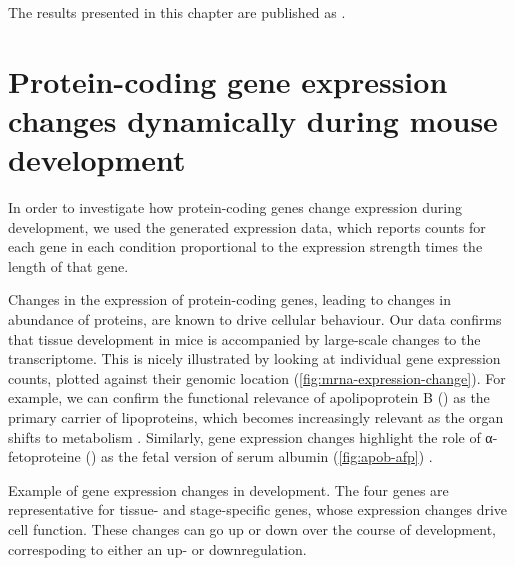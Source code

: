 The results presented in this chapter are published as \citet{Schmitt:2014}.


\section{Protein-coding gene expression changes dynamically during mouse
development}

In order to investigate how protein-coding genes change expression during
development, we used the generated \rnaseq expression data, which reports counts
for each gene in each condition proportional to the expression strength times
the length of that gene.

Changes in the expression of protein-coding genes, leading to changes in
abundance of proteins, are known to drive cellular behaviour\todo[ref]{}. Our
data confirms that tissue development in mice is accompanied by large-scale
changes to the \mrna transcriptome. This is nicely illustrated by looking at
individual gene expression counts, plotted against their genomic location
(\cref{fig:mrna-expression-change}). For example, we can confirm the functional
relevance of apolipoprotein B () as the primary carrier of
lipoproteins, which becomes increasingly relevant as the organ shifts to
metabolism \citep{Knott:1986}. Similarly, \mrna gene expression changes
highlight the role of α-fetoproteine () as the fetal version of
serum albumin (\cref{fig:apob-afp}) \citep{Chen:1997}.

    {Example of gene expression changes in development.}
    {The four genes are representative for tissue- and stage-specific genes,
    whose expression changes drive cell function. These changes can go up or
    down over the course of development, correspoding to either an up- or
    downregulation.}


